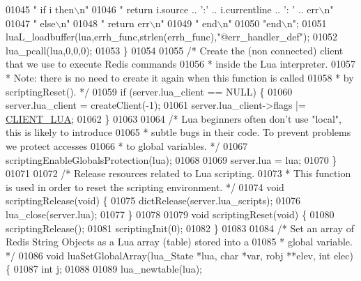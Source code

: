 \begin{DoxyCode}
{{{{{{{{01045                                 \textcolor{stringliteral}{"  if i then\(\backslash\)n"}
01046                                 \textcolor{stringliteral}{"    return i.source .. ':' .. i.currentline .. ': ' .. err\(\backslash\)n"}
01047                                 \textcolor{stringliteral}{"  else\(\backslash\)n"}
01048                                 \textcolor{stringliteral}{"    return err\(\backslash\)n"}
01049                                 \textcolor{stringliteral}{"  end\(\backslash\)n"}
01050                                 \textcolor{stringliteral}{"end\(\backslash\)n"};
01051         luaL\_loadbuffer(lua,errh\_func,strlen(errh\_func),\textcolor{stringliteral}{"@err\_handler\_def"});
01052         lua\_pcall(lua,0,0,0);
01053     \}
01054 
01055     \textcolor{comment}{/* Create the (non connected) client that we use to execute Redis commands}
01056 \textcolor{comment}{     * inside the Lua interpreter.}
01057 \textcolor{comment}{     * Note: there is no need to create it again when this function is called}
01058 \textcolor{comment}{     * by scriptingReset(). */}
01059     \textcolor{keywordflow}{if} (server.lua\_client == NULL) \{
01060         server.lua\_client = createClient(-1);
01061         server.lua\_client->flags |= \hyperlink{server_8h_af9d0b0f45ef2c1fd29ac714a300de706}{CLIENT\_LUA};
01062     \}
01063 
01064     \textcolor{comment}{/* Lua beginners often don't use "local", this is likely to introduce}
01065 \textcolor{comment}{     * subtle bugs in their code. To prevent problems we protect accesses}
01066 \textcolor{comment}{     * to global variables. */}
01067     scriptingEnableGlobalsProtection(lua);
01068 
01069     server.lua = lua;
01070 \}
01071 
01072 \textcolor{comment}{/* Release resources related to Lua scripting.}
01073 \textcolor{comment}{ * This function is used in order to reset the scripting environment. */}
01074 \textcolor{keywordtype}{void} scriptingRelease(\textcolor{keywordtype}{void}) \{
01075     dictRelease(server.lua\_scripts);
01076     lua\_close(server.lua);
01077 \}
01078 
01079 \textcolor{keywordtype}{void} scriptingReset(\textcolor{keywordtype}{void}) \{
01080     scriptingRelease();
01081     scriptingInit(0);
01082 \}
01083 
01084 \textcolor{comment}{/* Set an array of Redis String Objects as a Lua array (table) stored into a}
01085 \textcolor{comment}{ * global variable. */}
01086 \textcolor{keywordtype}{void} luaSetGlobalArray(lua\_State *lua, \textcolor{keywordtype}{char} *var, robj **elev, \textcolor{keywordtype}{int} elec) \{
01087     \textcolor{keywordtype}{int} j;
01088 
01089     lua\_newtable(lua);
}}}}}}}}
\end{DoxyCode}
